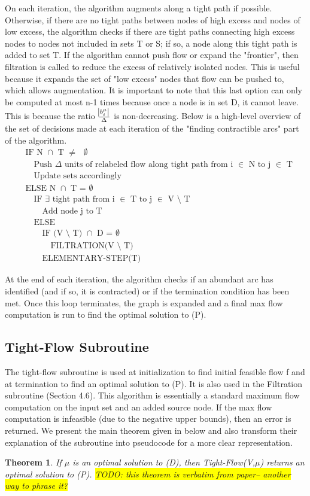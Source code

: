 \documentclass[11pt]{article}
\newtheorem{theorem}{Theorem}[section]
\theoremstyle{definition}
\theoremstyle{definition}
\newcommand{\todo}[1]{\colorbox{yellow}{TODO: #1}}
\begin{document}
On each iteration, the algorithm augments along a tight path if possible. Otherwise, if there are no tight paths between nodes of high excess and nodes of low excess, the algorithm checks if there are tight paths connecting high excess nodes to nodes not included in sets T or S; if so, a node along this tight path is added to set T. If the algorithm cannot push flow or expand the "frontier", then filtration is called to reduce the excess of relatively isolated nodes. This is useful because it expands the set of "low excess" nodes that flow can be pushed to, which allows augmentation. It is important to note that this last option can only be computed at most n-1 times because once a node is in set D, it cannot leave. This is because the ratio $\frac{\abs{b_i^\mu}}{\Delta}$ is non-decreasing. Below is a high-level overview of the set of decisions made at each iteration of the "finding contractible arcs" part of the algorithm.
\begin{align*}
&\text{IF N $\cap$ T $\neq$ $\emptyset$} \\
&\quad \text{Push $\Delta$ units of relabeled flow along tight path from i $\in$ N to j $\in$ T} \\ 
&\quad \text{Update sets accordingly} \\
&\text{ELSE N $\cap$ T = $\emptyset$} \\
&\quad \text{IF $\exists$ tight path from i $\in$ T to j $\in$ V $\setminus$ T} \\
&\quad \quad \text{Add node j to T} \\
&\quad \text{ELSE} \\
&\quad \quad \text{IF (V $\setminus$ T) $\cap$ D = $\emptyset$} \\
&\quad \quad \quad \text{FILTRATION(V $\setminus$ T)} \\
&\quad \quad \text{ELEMENTARY-STEP(T)} 
\end{align*}

At the end of each iteration, the algorithm checks if an abundant arc has identified (and if so, it is contracted) or if the termination condition has been met. Once this loop terminates, the graph is expanded and a final max flow computation is run to find the optimal solution to (P).
\subsection{Tight-Flow Subroutine}
The tight-flow subroutine is used at initialization to find initial feasible flow f and at termination to find an optimal solution to (P). It is also used in the Filtration subroutine (Section 4.6). This algorithm is essentially a standard maximum flow computation on the input set and an added source node. If the max flow computation is infeasible (due to the negative upper bounds), then an error is returned. We present the main theorem given in \cite{Vegh2013} below and also transform their explanation of the subroutine into pseudocode for a more clear representation.
\begin{theorem}
If $\mu$ is an optimal solution to (D), then Tight-Flow(V,$\mu$) returns an optimal solution to (P). \todo{this theorem is verbatim from paper-- another way to phrase it?}
\end{theorem}
\end{document}
